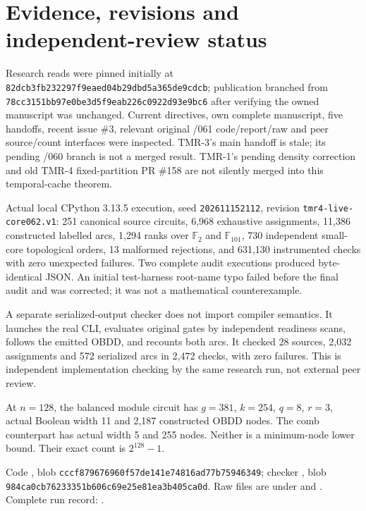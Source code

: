 \documentclass[11pt]{article}
\begin{document}
\section{Evidence, revisions and independent-review status}
Research reads were pinned initially at \texttt{82dcb3fb232297f9eaed04b29dbd5a365de9cdcb}; publication branched from \texttt{78cc3151bb97e0be3d5f9eab226c0922d93e9bc6} after verifying the owned manuscript was unchanged. Current directives, own complete manuscript, five handoffs, recent issue \#3, relevant original /061 code/report/raw and peer source/count interfaces were inspected. TMR-3's main handoff is stale; its pending /060 branch is not a merged result. TMR-1's pending density correction and old TMR-4 fixed-partition PR \#158 are not silently merged into this temporal-cache theorem.

Actual local CPython 3.13.5 execution, seed \texttt{202611152112}, revision \texttt{tmr4-live-core062.v1}: 251 canonical source circuits, 6,968 exhaustive assignments, 11,386 constructed labelled arcs, 1,294 ranks over $\mathbb F_2$ and $\mathbb F_{101}$, 730 independent small-core topological orders, 13 malformed rejections, and 631,130 instrumented checks with zero unexpected failures. Two complete audit executions produced byte-identical JSON. An initial test-harness root-name typo failed before the final audit and was corrected; it was not a mathematical counterexample.

A separate serialized-output checker does not import compiler semantics. It launches the real CLI, evaluates original gates by independent readiness scans, follows the emitted OBDD, and recounts both arcs. It checked 28 sources, 2,032 assignments and 572 serialized arcs in 2,472 checks, with zero failures. This is independent implementation checking by the same research run, not external peer review.

At $n=128$, the balanced module circuit has $g=381$, $k=254$, $q=8$, $r=3$, actual Boolean width 11 and 2,187 constructed OBDD nodes. The comb counterpart has actual width 5 and 255 nodes. Neither is a minimum-node lower bound. Their exact count is $2^{128}-1$.

Code , blob \texttt{cccf879676960f57de141e74816ad77b75946349}; checker , blob \texttt{984ca0cb76233351b606c69e25e81ea3b405ca0d}. Raw files are under  and . Complete run record: .
\end{document}
